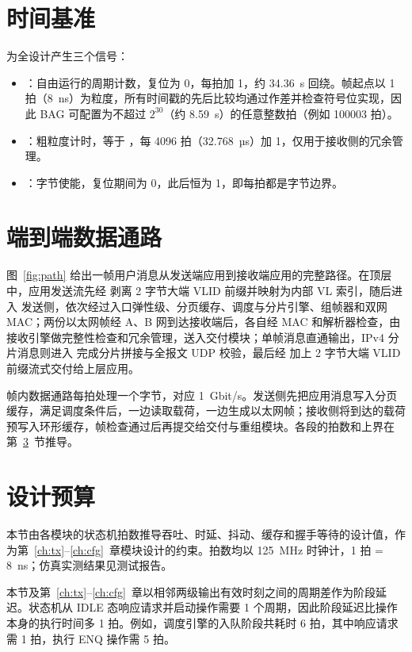 \section{时间基准}\label{sec:timebase}

 为全设计产生三个信号：
\begin{itemize}
  \item {}：自由运行的周期计数，复位为 0，每拍加 1，约 34.36~s 回绕。帧起点以 1 拍（8~ns）为粒度，所有时间戳的先后比较均通过作差并检查符号位实现，因此 BAG 可配置为不超过 $2^{30}$（约 8.59~s）的任意整数拍（例如 100003 拍）。
  \item {}：粗粒度计时，等于 ，每 4096 拍（32.768~µs）加 1，仅用于接收侧的冗余管理。
  \item {}：字节使能，复位期间为 0，此后恒为 1，即每拍都是字节边界。
\end{itemize}

\section{端到端数据通路}\label{sec:path}

图~\ref{fig:path} 给出一帧用户消息从发送端应用到接收端应用的完整路径。在顶层  中，应用发送流先经  剥离 2 字节大端 VLID 前缀并映射为内部 VL 索引，随后进入  发送侧，依次经过入口弹性级、分页缓存、调度与分片引擎、组帧器和双网 MAC；两份以太网帧经 A、B 网到达接收端后，各自经 MAC 和解析器检查，由接收引擎做完整性检查和冗余管理，送入交付模块；单帧消息直通输出，IPv4 分片消息则进入  完成分片拼接与全报文 UDP 校验，最后经  加上 2 字节大端 VLID 前缀流式交付给上层应用。

帧内数据通路每拍处理一个字节，对应 1~Gbit/s。发送侧先把应用消息写入分页缓存，满足调度条件后，一边读取载荷，一边生成以太网帧；接收侧将到达的载荷预写入环形缓存，帧检查通过后再提交给交付与重组模块。各段的拍数和上界在第~\ref{sec:budget}~节推导。

\section{设计预算}\label{sec:budget}

本节由各模块的状态机拍数推导吞吐、时延、抖动、缓存和握手等待的设计值，作为第~\ref{ch:tx}--\ref{ch:cfg}~章模块设计的约束。拍数均以 125~MHz 时钟计，1 拍 = 8~ns；仿真实测结果见测试报告。

本节及第~\ref{ch:tx}--\ref{ch:cfg}~章以相邻两级输出有效时刻之间的周期差作为阶段延迟。状态机从 IDLE 态响应请求并启动操作需要 1 个周期，因此阶段延迟比操作本身的执行时间多 1 拍。例如，调度引擎的入队阶段共耗时 6 拍，其中响应请求需 1 拍，执行 ENQ 操作需 5 拍。

